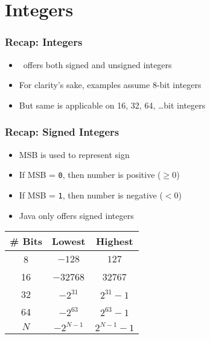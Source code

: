 \section{Integers}
\frame{\tableofcontents[currentsection]}

\begin{frame}
  \frametitle{Recap: Integers}
  \begin{itemize}
    \item \cpp\ offers both signed and unsigned integers
    \item For clarity's sake, examples assume 8-bit integers
    \item But same is applicable on 16, 32, 64, \dots bit integers
  \end{itemize}
\end{frame}

\begin{frame}
  \frametitle{Recap: Signed Integers}
  \begin{itemize}
    \item MSB is used to represent sign
    \item If MSB = \texttt{0}, then number is positive ($\geq 0$)
    \item If MSB = \texttt{1}, then number is negative ($< 0$)
    \item Java only offers signed integers
  \end{itemize}
  \begin{center}
  \end{center}
  \begin{center}
    \begin{tabular}{ccc}
      \toprule
      \textbf{\# Bits} & \textbf{Lowest} & \textbf{Highest} \\
      \midrule
      8 & $-128$ & $127$ \\
      16 & \num{-32768} & \num{32767} \\
      32 & $-2^{31}$ & $2^{31}-1$ \\
      64 & $-2^{63}$ & $2^{63}-1$ \\
      $N$ & $-2^{N-1}$ & $2^{N-1}-1$ \\
      \bottomrule
    \end{tabular}
  \end{center}
\end{frame}

